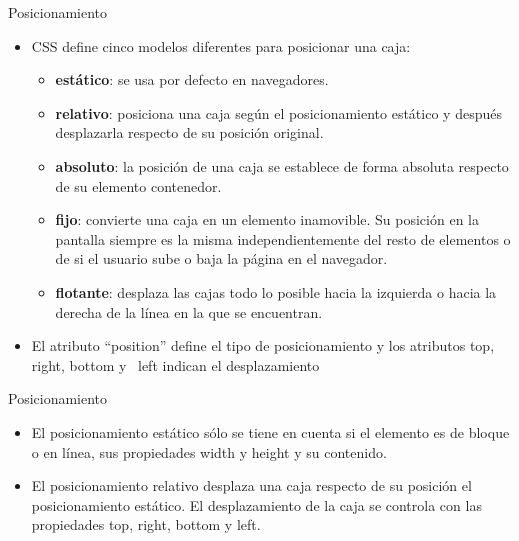 \documentclass[aspectratio=43,10pt,t]{beamer}
\begin{document}
\begin{frame}{Posicionamiento}\relax
\begingroup
{}
\begin{itemize}
  \item\relax CSS define cinco modelos diferentes para posicionar una caja:
  \begin{itemize}
    \item\relax \textbf{estático}: se usa por defecto en navegadores.
    \item\relax \textbf{relativo}: posiciona una caja según el posicionamiento estático y después desplazarla respecto de su posición original.
    \item\relax \textbf{absoluto}: la posición de una caja se establece de forma absoluta respecto de su elemento contenedor.
    \item\relax \textbf{fijo}: convierte una caja en un elemento inamovible. Su posición en la pantalla siempre es la misma independientemente del resto de elementos o de si el usuario sube o baja la página en el navegador.
    \item\relax \textbf{flotante}: desplaza las cajas todo lo posible hacia la izquierda o hacia la derecha de la línea en la que se encuentran.
  \end{itemize}
  \item\relax El atributo “position” define el tipo de posicionamiento y los atributos top, right, bottom y ~left indican el desplazamiento
\end{itemize}
\endgroup
\end{frame}

\begin{frame}{Posicionamiento}\relax
\begingroup
{}
\begin{itemize}
  \item\relax El posicionamiento estático sólo se tiene en cuenta si el elemento es de bloque o en línea, sus propiedades width y height y su contenido.
  \item\relax El posicionamiento relativo desplaza una caja respecto de su posición el posicionamiento estático. El desplazamiento de la caja se controla con las propiedades top, right, bottom y left.
\end{itemize}
\endgroup
{}
\end{frame}
\end{document}
